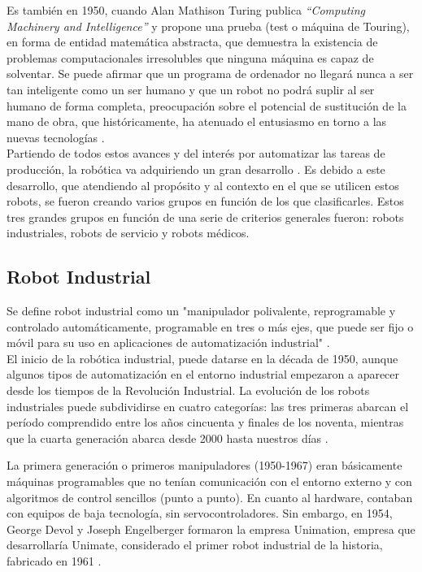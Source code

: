 Es también en 1950, cuando Alan Mathison Turing publica \textit{“Computing Machinery and Intelligence”} y propone una prueba (test o máquina de Touring), en forma de entidad matemática abstracta, que demuestra la existencia de problemas computacionales irresolubles que ninguna máquina es capaz de solventar. Se puede afirmar que un programa de ordenador no llegará nunca a ser tan inteligente como un ser humano y que un robot no podrá suplir al ser humano de forma completa, \cite{Sanchez07b} preocupación sobre el potencial de sustitución de la mano de obra, que históricamente, ha atenuado el entusiasmo en torno a las nuevas tecnologías \cite{Mokyr15}.\\

Partiendo de todos estos avances y del interés por automatizar las tareas de producción, la robótica va adquiriendo un gran desarrollo \cite{Sanchez07b}. Es debido a este desarrollo, que atendiendo al propósito y al contexto en el que se utilicen estos robots, se fueron creando varios grupos en función de los que clasificarles. Estos tres grandes grupos en función de una serie de criterios generales fueron: robots industriales, robots de servicio y robots médicos.

\subsection{Robot Industrial}
\label{sec:robot_industrial}

Se define robot industrial como un "manipulador polivalente, reprogramable y controlado automáticamente, programable en tres o más ejes, que puede ser fijo o móvil para su uso en aplicaciones de automatización industrial" \cite{ISO8373}.\\

El inicio de la robótica industrial, puede datarse en la década de 1950, aunque algunos tipos de automatización en el entorno industrial empezaron a aparecer desde los tiempos de la Revolución Industrial. La evolución de los robots industriales puede subdividirse en cuatro categorías: las tres primeras abarcan el período comprendido entre los años cincuenta y finales de los noventa, mientras que la cuarta generación abarca desde 2000 hasta nuestros días \cite{Gasparetto19}.


La primera generación o primeros manipuladores (1950-1967) eran básicamente máquinas programables que no tenían comunicación con el entorno externo y con algoritmos de control sencillos (punto a punto). En cuanto al hardware, contaban con equipos de baja tecnología, sin servocontroladores. Sin embargo, en 1954, George Devol y Joseph Engelberger formaron la empresa Unimation, empresa que desarrollaría Unimate, considerado el primer robot industrial de la historia, fabricado en 1961 \cite{Zamalloa17}.
  
